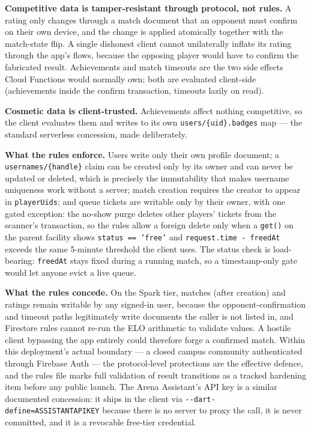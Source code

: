 \documentclass{configurations/polimi3i_thesis}
\renewcommand{\_}{\textunderscore\allowbreak}
\begin{document}
\textbf{Competitive data is tamper-resistant through protocol, not rules.} A rating only changes through a match document that an opponent must confirm on their own device, and the change is applied atomically together with the match-state flip. A single dishonest client cannot unilaterally inflate its rating through the app's flows, because the opposing player would have to confirm the fabricated result. Achievements and match timeouts are the two side effects Cloud Functions would normally own; both are evaluated client-side (achievements inside the confirm transaction, timeouts lazily on read).

\textbf{Cosmetic data is client-trusted.} Achievements affect nothing competitive, so the client evaluates them and writes to its own \texttt{users/\{uid\}.badges} map — the standard serverless concession, made deliberately.

\textbf{What the rules enforce.} Users write only their own profile document; a \texttt{usernames/\{handle\}} claim can be created only by its owner and can never be updated or deleted, which is precisely the immutability that makes username uniqueness work without a server; match creation requires the creator to appear in \texttt{playerUids}; and queue tickets are writable only by their owner, with one gated exception: the no-show purge deletes other players' tickets from the scanner's transaction, so the rules allow a foreign delete only when a \texttt{get()} on the parent facility shows \texttt{status == 'free'} and \texttt{request.time - freedAt} exceeds the same 5-minute threshold the client uses. The status check is load-bearing: \texttt{freedAt} stays fixed during a running match, so a timestamp-only gate would let anyone evict a live queue.

\textbf{What the rules concede.} On the Spark tier, matches (after creation) and ratings remain writable by any signed-in user, because the opponent-confirmation and timeout paths legitimately write documents the caller is not listed in, and Firestore rules cannot re-run the ELO arithmetic to validate values. A hostile client bypassing the app entirely could therefore forge a confirmed match. Within this deployment's actual boundary — a closed campus community authenticated through Firebase Auth — the protocol-level protections are the effective defence, and the rules file marks full validation of result transitions as a tracked hardening item before any public launch. The Arena Assistant's API key is a similar documented concession: it ships in the client via \texttt{-{}-dart-define=ASSISTANT\_API\_KEY} because there is no server to proxy the call, it is never committed, and it is a revocable free-tier credential.
\end{document}

